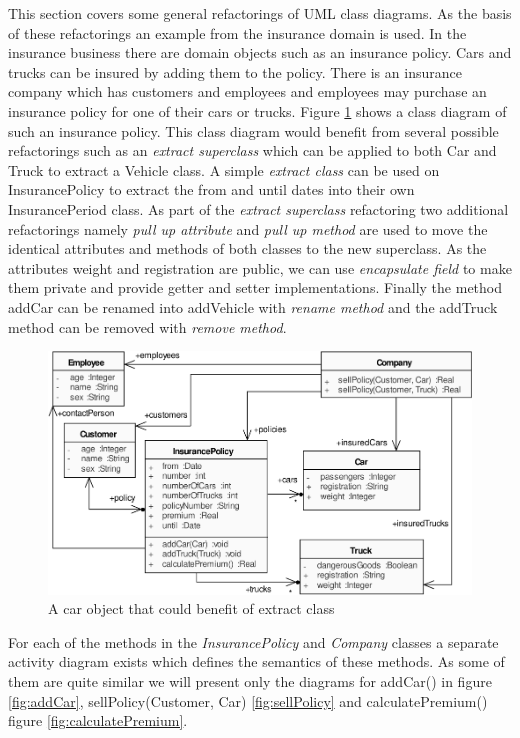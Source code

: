 \documentclass{llncs}
\begin{document}
This section covers some general refactorings of UML class diagrams. As the basis of these refactorings an example from the insurance
domain is used. In the insurance business there are domain objects such as an insurance policy. Cars and trucks can be insured by 
adding them to the policy. There is an insurance company which has customers and employees and employees may purchase an insurance policy 
for one of their cars or trucks. Figure \ref{fig:classdiagramcomplex} shows a class diagram of such an insurance policy. This class 
diagram would benefit from several possible refactorings such as an \textit{extract superclass} which can be applied to both Car and Truck 
to extract a Vehicle class. A simple \textit{extract class} can be used on InsurancePolicy to extract the from and until dates into their
own InsurancePeriod class. As part of the \textit{extract superclass} refactoring two additional refactorings namely \textit{pull up 
attribute} and \textit{pull up method} are used to move the identical attributes and methods of both classes to the new superclass. As the 
attributes weight and registration are public, we can use \textit{encapsulate field} to make them private and provide getter and setter 
implementations. Finally the method addCar can be renamed into addVehicle with \textit{rename method} and the addTruck method can be 
removed with \textit{remove method}.

\begin{figure}[h!t]
 \centering
 \includegraphics[scale=0.7]{images/ClassDiagramComplex.pdf}
 \caption{A car object that could benefit of extract class}
 \label{fig:classdiagramcomplex}
\end{figure}

For each of the methods in the \textit{InsurancePolicy} and \textit{Company} classes a separate activity diagram exists
which defines the semantics of these methods. As some of them are quite similar we will present only the diagrams for
addCar() in figure \ref{fig:addCar}, sellPolicy(Customer, Car) \ref{fig:sellPolicy} and calculatePremium() figure \ref{fig:calculatePremium}.
\end{document}
